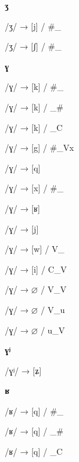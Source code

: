 \begin{center}\textbf{ʒ}\end{center}
\begin{multicols}{4}
\noindent /ʒ/ → [j] / \#\_

\noindent /ʒ/ → [ʃ] / \#\_
\end{multicols}

\begin{center}\textbf{ɣ}\end{center}
\begin{multicols}{4}
\noindent /ɣ/ → [k] / \#\_

\noindent /ɣ/ → [k] / \_\#

\noindent /ɣ/ → [k] / \_C

\noindent /ɣ/ → [g] / \#\_Vx

\noindent /ɣ/ → [q]

\noindent /ɣ/ → [x] / \#\_

\noindent /ɣ/ → [ʁ]

\noindent /ɣ/ → [j]

\noindent /ɣ/ → [w] / V\_

\noindent /ɣ/ → [i] / C\_V

\noindent /ɣ/ → $\varnothing$ / V\_V

\noindent /ɣ/ → $\varnothing$ / V\_u

\noindent /ɣ/ → $\varnothing$ / u\_V
\end{multicols}


\begin{center}\textbf{ɣʲ}\end{center}
\begin{multicols}{4}
\noindent /ɣʲ/ → [ʑ]
\end{multicols}


\begin{center}\textbf{ʁ}\end{center}
\begin{multicols}{4}
\noindent /ʁ/ → [q] / \#\_

\noindent /ʁ/ → [q] / \_\#

\noindent /ʁ/ → [q] / \_C
\end{multicols}



